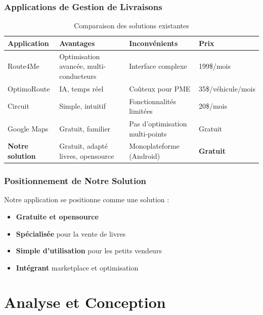 \documentclass[12pt,a4paper]{report}
\begin{document}
\subsection{Applications de Gestion de Livraisons}

\begin{table}[H]
\centering
\begin{tabular}{|l|p{3cm}|p{3cm}|p{3cm}|}
\hline
\textbf{Application} & \textbf{Avantages} & \textbf{Inconvénients} & \textbf{Prix} \\
\hline
Route4Me & Optimisation avancée, multi-conducteurs & Interface complexe & 199\$/mois \\
\hline
OptimoRoute & IA, temps réel & Coûteux pour PME & 35\$/véhicule/mois \\
\hline
Circuit & Simple, intuitif & Fonctionnalités limitées & 20\$/mois \\
\hline
Google Maps & Gratuit, familier & Pas d'optimisation multi-points & Gratuit \\
\hline
\textbf{Notre solution} & Gratuit, adapté livres, opensource & Monoplateforme (Android) & \textbf{Gratuit} \\
\hline
\end{tabular}
\caption{Comparaison des solutions existantes}
\end{table}

\subsection{Positionnement de Notre Solution}

Notre application se positionne comme une solution :
\begin{itemize}
    \item \textbf{Gratuite et opensource}
    \item \textbf{Spécialisée} pour la vente de livres
    \item \textbf{Simple d'utilisation} pour les petits vendeurs
    \item \textbf{Intégrant} marketplace et optimisation
\end{itemize}


\chapter{Analyse et Conception}
\end{document}
